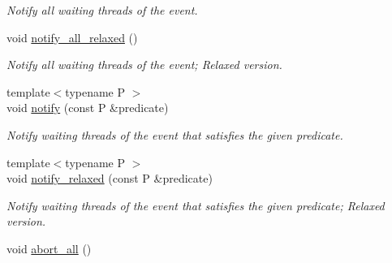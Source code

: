 \begin{DoxyCompactItemize}
\begin{DoxyCompactList}\small\item\em Notify all waiting threads of the event. \end{DoxyCompactList}\item 
\hypertarget{classtbb_1_1internal_1_1concurrent__monitor_a3a1925f904f6e7967d0af1dfb35d9dd4}{}void \hyperlink{classtbb_1_1internal_1_1concurrent__monitor_a3a1925f904f6e7967d0af1dfb35d9dd4}{notify\+\_\+all\+\_\+relaxed} ()\label{classtbb_1_1internal_1_1concurrent__monitor_a3a1925f904f6e7967d0af1dfb35d9dd4}

\begin{DoxyCompactList}\small\item\em Notify all waiting threads of the event; Relaxed version. \end{DoxyCompactList}\item 
\hypertarget{classtbb_1_1internal_1_1concurrent__monitor_a83b6f503d11bc425726dda8eb59424d5}{}{\footnotesize template$<$typename P $>$ }\\void \hyperlink{classtbb_1_1internal_1_1concurrent__monitor_a83b6f503d11bc425726dda8eb59424d5}{notify} (const P \&predicate)\label{classtbb_1_1internal_1_1concurrent__monitor_a83b6f503d11bc425726dda8eb59424d5}

\begin{DoxyCompactList}\small\item\em Notify waiting threads of the event that satisfies the given predicate. \end{DoxyCompactList}\item 
\hypertarget{classtbb_1_1internal_1_1concurrent__monitor_af7a3900f62bc4e261f11688b7c57349e}{}{\footnotesize template$<$typename P $>$ }\\void \hyperlink{classtbb_1_1internal_1_1concurrent__monitor_af7a3900f62bc4e261f11688b7c57349e}{notify\+\_\+relaxed} (const P \&predicate)\label{classtbb_1_1internal_1_1concurrent__monitor_af7a3900f62bc4e261f11688b7c57349e}

\begin{DoxyCompactList}\small\item\em Notify waiting threads of the event that satisfies the given predicate; Relaxed version. \end{DoxyCompactList}\item 
\hypertarget{classtbb_1_1internal_1_1concurrent__monitor_aba73b319c5ccbef0ba26bf83f6a34e33}{}void \hyperlink{classtbb_1_1internal_1_1concurrent__monitor_aba73b319c5ccbef0ba26bf83f6a34e33}{abort\+\_\+all} ()\label{classtbb_1_1internal_1_1concurrent__monitor_aba73b319c5ccbef0ba26bf83f6a34e33}


\end{DoxyCompactItemize}
